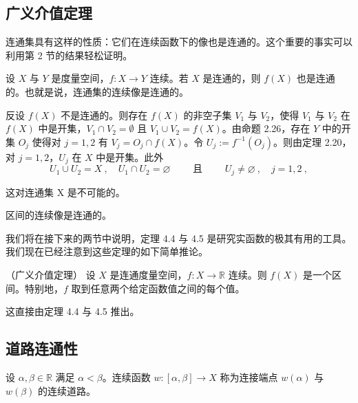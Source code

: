 \subsection*{广义介值定理}

连通集具有这样的性质：它们在连续函数下的像也是连通的。这个重要的事实可以利用第 2 节的结果轻松证明。

\begin{theorem}

设 $X$ 与 $Y$ 是度量空间，$f: X \to Y$ 连续。若 $X$ 是连通的，则 $f(X)$ 也是连通的。也就是说，连通集的连续像是连通的。

\proofhead
反设 $f(X)$ 不是连通的。则存在 $f(X)$ 的非空子集 $V_1$ 与 $V_2$，使得 $V_1$ 与 $V_2$ 在 $f(X)$ 中是开集，$V_1 \cap V_2 = \emptyset$ 且 $V_1 \cup V_2 = f(X)$。由命题 2.26，存在 $Y$ 中的开集 $O_j$ 使得对 $j = 1,2$ 有 $V_j = O_j \cap f(X)$。令 $U_j := f^{-1}(O_j)$。则由定理 2.20，对 $j = 1,2$，$U_j$ 在 $X$ 中是开集。此外
\[
U_{1}\cup U_{2}=X~,\quad U_{1}\cap U_{2}=\varnothing\qquad\text{ 且 }\qquad U_{j}\neq\varnothing~,\quad j=1,2~,
\]

这对连通集 X 是不可能的。

\end{theorem}

\begin{corollary}

区间的连续像是连通的。

我们将在接下来的两节中说明，定理 4.4 与 4.5 是研究实函数的极其有用的工具。我们现在已经注意到这些定理的如下简单推论。

\end{corollary}

\begin{theorem}

（广义介值定理） 设 $X$ 是连通度量空间，$f: X \to \mathbb{R}$ 连续。则 $f(X)$ 是一个区间。特别地，$f$ 取到任意两个给定函数值之间的每个值。

\proofhead
这直接由定理 4.4 与 4.5 推出。
\end{theorem}

\subsection*{道路连通性}

设 $\alpha, \beta \in \mathbb{R}$ 满足 $\alpha < \beta$。连续函数 $w: [\alpha, \beta] \to X$ 称为连接端点 $w(\alpha)$ 与 $w(\beta)$ 的连续道路。


